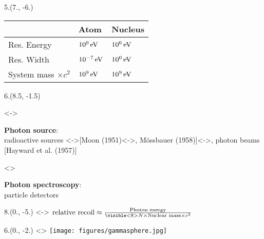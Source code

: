 \begin{textblock}{5.}(7., -6.)
    \begin{center}
        \begin{tabular}{lll}
        & Atom & Nucleus \\
        \hline
        Res. Energy & $\unit[10^{0}]{eV}$ & $\unit[10^{6}]{eV}$ \\
        Res. Width & $\unit[10^{-7}]{eV}$ & $\unit[10^{0}]{eV}$ \\
        System mass $\times c^2$ & $\unit[10^{9}]{eV}$ & $\unit[10^{9}]{eV}$ \\
        \end{tabular}
    \end{center}
\end{textblock}

\begin{textblock}{6.}(8.5, -1.5)
    \begin{itemize}
    \visible<\SLIDEPHOTONSOURCE->{
        \item \textbf{Photon source}: \\ 
        radioactive sources \visible<\SLIDEWHEEL->{[Moon (1951)\visible<\SLIDEMOESSBAUER->{, M\"ossbauer (1958)}]}\visible<\SLIDEBEAM->{, photon beams [Hayward et al. (1957)]}
    }
    \visible<\SLIDEDETECTION>{
        \item \textbf{Photon spectroscopy}: \\
        particle detectors
    }
    \end{itemize}
\end{textblock}

\begin{textblock}{8.}(0., -5.)
    \visible<\SLIDERECOIL-\SLIDEMOESSBAUER>{
        $\text{relative recoil} \approx \frac{\text{Photon energy}}{\visible<\SLIDEMOESSBAUER>{N \times } \text{Nuclear mass} \times c^2}$
    }
\end{textblock}

\begin{textblock}{6.}(0., -2.)
    \visible<\SLIDEDETECTION>{
        \texttt{[image: figures/gammasphere.jpg]}
    }
\end{textblock}